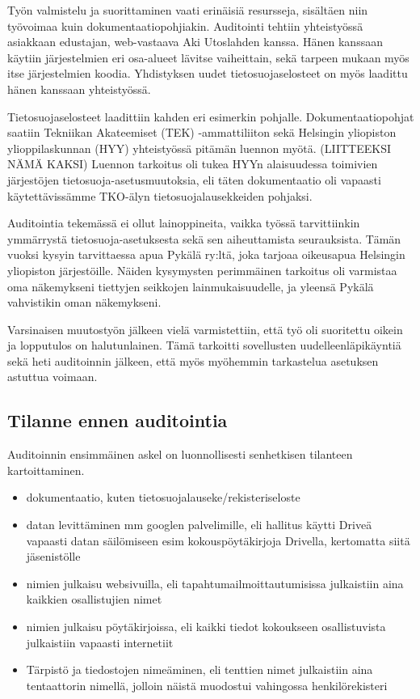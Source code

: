 \documentclass[finnish]{tktltiki}
\begin{document}
Työn valmistelu ja suorittaminen vaati erinäisiä resursseja, sisältäen niin työvoimaa kuin dokumentaatiopohjiakin. Auditointi tehtiin yhteistyössä asiakkaan edustajan, web-vastaava Aki Utoslahden kanssa. Hänen kanssaan käytiin järjestelmien eri osa-alueet lävitse vaiheittain, sekä tarpeen mukaan myös itse järjestelmien koodia. Yhdistyksen uudet tietosuojaselosteet on myös laadittu hänen kanssaan yhteistyössä. 

Tietosuojaselosteet laadittiin kahden eri esimerkin pohjalle. Dokumentaatiopohjat saatiin Tekniikan Akateemiset (TEK) -ammattiliiton sekä Helsingin yliopiston ylioppilaskunnan (HYY) yhteistyössä pitämän luennon myötä. (LIITTEEKSI NÄMÄ KAKSI) Luennon tarkoitus oli tukea HYYn alaisuudessa toimivien järjestöjen tietosuoja-asetusmuutoksia, eli täten dokumentaatio oli vapaasti käytettävissämme TKO-älyn tietosuojalausekkeiden pohjaksi.

Auditointia tekemässä ei ollut lainoppineita, vaikka työssä tarvittiinkin ymmärrystä tietosuoja-asetuksesta sekä sen aiheuttamista seurauksista. Tämän vuoksi kysyin tarvittaessa apua Pykälä ry:ltä, joka tarjoaa oikeusapua Helsingin yliopiston järjestöille. Näiden kysymysten perimmäinen tarkoitus oli varmistaa oma näkemykseni tiettyjen seikkojen lainmukaisuudelle, ja yleensä Pykälä vahvistikin oman näkemykseni.

Varsinaisen muutostyön jälkeen vielä varmistettiin, että työ oli suoritettu oikein ja lopputulos on halutunlainen. Tämä tarkoitti sovellusten uudelleenläpikäyntiä sekä heti auditoinnin jälkeen, että myös myöhemmin tarkastelua asetuksen astuttua voimaan.


\subsection{Tilanne ennen auditointia}

Auditoinnin ensimmäinen askel on luonnollisesti senhetkisen tilanteen kartoittaminen.

\begin{itemize}
\item dokumentaatio, kuten tietosuojalauseke/rekisteriseloste
\item  datan levittäminen mm googlen palvelimille, eli hallitus käytti Driveä vapaasti datan säilömiseen esim kokouspöytäkirjoja Drivella, kertomatta siitä jäsenistölle
\item  nimien julkaisu websivuilla, eli tapahtumailmoittautumisissa julkaistiin aina kaikkien osallistujien nimet
\item  nimien julkaisu pöytäkirjoissa, eli kaikki tiedot kokoukseen osallistuvista julkaistiin vapaasti internetiit
\item Tärpistö ja tiedostojen nimeäminen, eli tenttien nimet julkaistiin aina tentaattorin nimellä, jolloin näistä muodostui vahingossa henkilörekisteri
\end{itemize}
\end{document}
